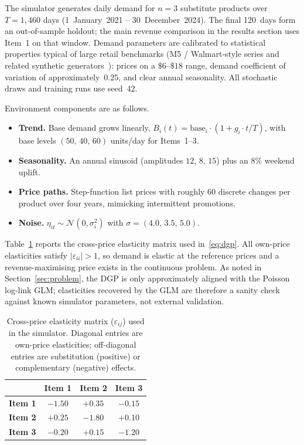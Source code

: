 \documentclass[journal, 10pt, twoside]{IEEEtran}
\begin{document}
The simulator generates daily demand for $n=3$ substitute products over
$T=1{,}460$ days (1~January~2021 -- 30~December~2024).
The final 120~days form an out-of-sample holdout; the main revenue
comparison in the results section uses Item~1 on that window.
Demand parameters are calibrated to statistical properties typical of
large retail benchmarks (M5 / Walmart-style series and related synthetic
generators~\cite{xia2023}): prices on a $\$6$--$\$18$ range, demand
coefficient of variation of approximately~$0.25$, and clear annual
seasonality.
All stochastic draws and training runs use seed~$42$.

Environment components are as follows.
\begin{itemize}
  \item \textbf{Trend.}
    Base demand grows linearly,
    $B_i(t)=\mathrm{base}_i\cdot(1+g_i\cdot t/T)$, with base levels
    $(50,\,40,\,60)$ units/day for Items~1--3.
  \item \textbf{Seasonality.}
    An annual sinusoid (amplitudes $12$, $8$, $15$) plus an $8\%$
    weekend uplift.
  \item \textbf{Price paths.}
    Step-function list prices with roughly $60$ discrete changes per
    product over four years, mimicking intermittent promotions.
  \item \textbf{Noise.}
    $\eta_{it}\sim\mathcal{N}(0,\sigma_i^2)$ with
    $\sigma=(4.0,\,3.5,\,5.0)$.
\end{itemize}

Table~\ref{tab:elasticity_matrix} reports the cross-price elasticity
matrix used in~\eqref{eq:dgp}.
All own-price elasticities satisfy $|\varepsilon_{ii}|>1$, so demand is
elastic at the reference prices and a revenue-maximising price exists in
the continuous problem.
As noted in Section~\ref{sec:problem}, the DGP is only approximately
aligned with the Poisson log-link GLM; elasticities recovered by the GLM
are therefore a sanity check against known simulator parameters, not
external validation.

\begin{table}[H]
\centering
\caption{Cross-price elasticity matrix ($\varepsilon_{ij}$) used in the
simulator.
Diagonal entries are own-price elasticities; off-diagonal entries are
substitution (positive) or complementary (negative) effects.}
\label{tab:elasticity_matrix}
\begin{tabular}{lccc}
\toprule
& \textbf{Item 1} & \textbf{Item 2} & \textbf{Item 3} \\
\midrule
\textbf{Item 1} & $-1.50$ & $+0.35$ & $-0.15$ \\
\textbf{Item 2} & $+0.25$ & $-1.80$ & $+0.10$ \\
\textbf{Item 3} & $-0.20$ & $+0.15$ & $-1.20$ \\
\bottomrule
\end{tabular}
\end{table}
\end{document}

